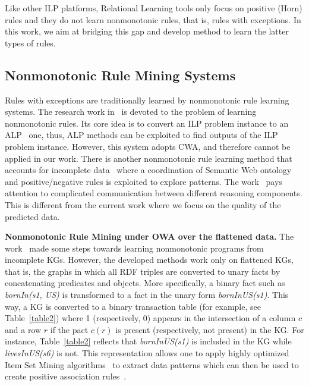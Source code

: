 Like other ILP platforms, Relational Learning tools only focus on positive (Horn) rules and they do not learn nonmonotonic rules, that is, rules with exceptions. In this work, we aim at bridging this gap and develop method to learn the latter types of rules.

\subsection{Nonmonotonic Rule Mining Systems}
\label{related-work-nonmonotonic-rule-mining-systems}

Rules with exceptions are traditionally learned by nonmonotonic rule learning systems. The research work in~\cite{ref32} is devoted to the problem of learning nonmonotonic rules. Its core idea is to convert an ILP problem instance to an ALP~\cite{ref31} one, thus, ALP methods can be exploited to find outputs of the ILP problem instance. However, this system adopts CWA, and therefore cannot be applied in our work. There is another nonmonotonic rule learning method that accounts for incomplete data~\cite{ref34} where a coordination of Semantic Web ontology and positive/negative rules is exploited to explore patterns. The work~\cite{ref34} pays attention to complicated communication between different reasoning components. This is different from the current work where we focus on the quality of the predicted data.

\textbf{Nonmonotonic Rule Mining under OWA over the flattened data.} The work~\cite{ref12} made some steps towards learning nonmonotonic programs from incomplete KGs. However, the developed methods work only on flattened KGs, that is, the graphs in which all RDF triples are converted to unary facts by concatenating predicates and objects. More specifically, a binary fact such as \textit{bornIn(s1, US)} is transformed to a fact in the unary form \textit{bornInUS(s1)}. This way, a KG is converted to a binary transaction table (for example, see Table~\ref{table2}) where 1 (respectively, 0) appears in the intersection of a column $c$ and a row $r$ if the pact $c(r)$ is present (respectively, not present) in the KG. For instance, Table~\ref{table2} reflects that \textit{bornInUS(s1)} is included in the KG while \textit{livesInUS(s6)} is not. This representation allows one to apply highly optimized Item Set Mining algorithms~\cite{ref37} to extract data patterns which can then be used to create positive association rules~\cite{ref13}.

